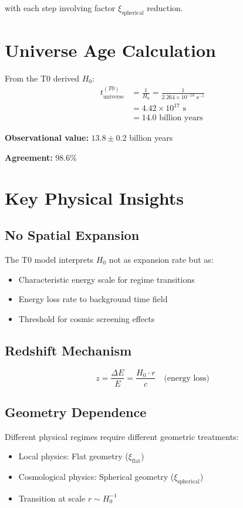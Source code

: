 \documentclass[12pt,a4paper]{article}
\begin{document}
	with each step involving factor $\xi_{\text{spherical}}$ reduction.
	
	\section{Universe Age Calculation}
	
	From the T0 derived $H_0$:
	\begin{align}
		t_{\text{universe}}^{(T0)} &= \frac{1}{H_0} = \frac{1}{2.264 \times 10^{-18} \text{ s}^{-1}} \\
		&= 4.42 \times 10^{17} \text{ s} \\
		&= 14.0 \text{ billion years}
	\end{align}
	
	\textbf{Observational value:} $13.8 \pm 0.2$ billion years
	
	\textbf{Agreement:} $98.6\%$
	
	\section{Key Physical Insights}
	
	\subsection{No Spatial Expansion}
	The T0 model interprets $H_0$ not as expansion rate but as:
	\begin{itemize}
		\item Characteristic energy scale for regime transitions
		\item Energy loss rate to background time field
		\item Threshold for cosmic screening effects
	\end{itemize}
	
	\subsection{Redshift Mechanism}
	\begin{equation}
		z = \frac{\Delta E}{E} = \frac{H_0 \cdot r}{c} \quad \text{(energy loss)}
	\end{equation}
	
	\subsection{Geometry Dependence}
	Different physical regimes require different geometric treatments:
	\begin{itemize}
		\item Local physics: Flat geometry ($\xi_{\text{flat}}$)
		\item Cosmological physics: Spherical geometry ($\xi_{\text{spherical}}$)
		\item Transition at scale $r \sim H_0^{-1}$
	\end{itemize}
	
\end{document}
